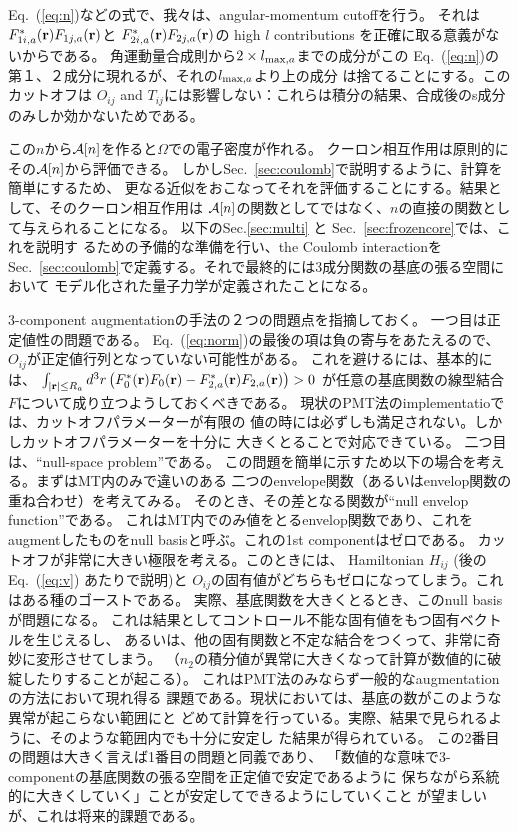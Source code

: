 \documentclass[twocolumn,showpacs,preprintnumbers,amsmath,amssymb,floatfix]{revtex4-1}
\newcommand{\bfr}{{\bf r}}
\def\calR{{\cal A}}
\newcommand{\req}[1]{\mbox{Eq.~\!(\ref{#1})}}
\newcommand{\refsec}[1]{\mbox{Sec.~\!\ref{#1}}}
\def\intaa{\int_{|\bfr|\leq R_a}}
\def\rhoij{\rho_{ij}}
\begin{document}
\req{eq:n}などの式で、我々は、angular-momentum cutoffを行う。
それは$F^*_{1i,a}(\bfr) F_{1j,a}(\bfr)$と
$F^*_{2i,a}(\bfr) F_{2j,a}(\bfr)$の high $l$ contributions
を正確に取る意義がないからである。
角運動量合成則から$2\times l_{{\rm max},a}$までの成分がこの
\req{eq:n}の第１、２成分に現れるが、それの$l_{{\rm max},a}$より上の成分
は捨てることにする。このカットオフは
$O_{ij}$ and $T_{ij}$には影響しない：これらは積分の結果、合成後のs成分
のみしか効かないためである。

この$n$から$\calR[n]$を作ると$\Omega$での電子密度が作れる。
クーロン相互作用は原則的にその$\calR[n]$から評価できる。
しかし\refsec{sec:coulomb}で説明するように、計算を簡単にするため、
更なる近似をおこなってそれを評価することにする。結果として、そのクーロン相互作用は
$\calR[n]$の関数としてではなく、$n$の直接の関数として与えられることになる。
以下のSec.\ref{sec:multi} と \refsec{sec:frozencore}では、これを説明す
るための予備的な準備を行い、the Coulomb interactionを
\refsec{sec:coulomb}で定義する。それで最終的には3成分関数の基底の張る空間において
モデル化された量子力学が定義されたことになる。

3-component augmentationの手法の２つの問題点を指摘しておく。
一つ目は正定値性の問題である。
\req{eq:norm}の最後の項は負の寄与をあたえるので、
$O_{ij}$が正定値行列となっていない可能性がある。
これを避けるには、基本的には、
$\intaa d^3r \left(F^*_{0}(\bfr)F_{0}(\bfr)-F^*_{2,a}(\bfr)F_{2,a}(\bfr)\right)>0$ 
が任意の基底関数の線型結合$F$について成り立つようしておくべきである。
現状のPMT法のimplementatioでは、カットオフパラメーターが有限の
値の時には必ずしも満足されない。しかしカットオフパラメーターを十分に
大きくとることで対応できている。
二つ目は、``null-space problem''である。
この問題を簡単に示すため以下の場合を考える。まずはMT内のみで違いのある
二つのenvelope関数（あるいはenvelop関数の重ね合わせ）を考えてみる。
そのとき、その差となる関数が``null envelop function''である。
これはMT内でのみ値をとるenvelop関数であり、これをaugmentしたものをnull
basisと呼ぶ。これの1st componentはゼロである。
カットオフが非常に大きい極限を考える。このときには、
Hamiltonian $H_{ij}$ (後の\req{eq:v} あたりで説明)と 
$O_{ij}$の固有値がどちらもゼロになってしまう。これはある種のゴーストである。
実際、基底関数を大きくとるとき、このnull basisが問題になる。
これは結果としてコントロール不能な固有値をもつ固有ベクトルを生じえるし、
あるいは、他の固有関数と不定な結合をつくって、非常に奇妙に変形させてしまう。
（$n_2$の積分値が異常に大きくなって計算が数値的に破綻したりすることが起こる）。
これはPMT法のみならず一般的なaugmentationの方法において現れ得る
課題である。現状においては、基底の数がこのような異常が起こらない範囲にと
どめて計算を行っている。実際、結果で見られるように、そのような範囲内でも十分に安定し
た結果が得られている。
この2番目の問題は大きく言えば1番目の問題と同義であり、
「数値的な意味で3-componentの基底関数の張る空間を正定値で安定であるように
保ちながら系統的に大きくしていく」ことが安定してできるようにしていくこと
が望ましいが、これは将来的課題である。
\end{document}
